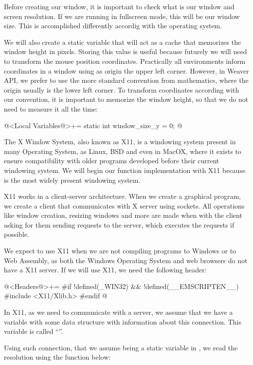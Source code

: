 Before creating our window, it is important to check what is our
window and screen resolution. If we are running in fullscreen mode,
this will be our window size. This is accomplished differently
accordig with the operating system.

We will also create a static variable that will act as a cache that
memorizes the window height in pixels. Storing this value is useful
because futurely we will need to transform the mouse position
coordinates. Practically all environments inform coordinates in a
window using as origin the upper left corner. However, in Weaver API,
we prefer to use the more standard convention from mathematics, where
the origin usually is the lower left corner. To transform coordinates
according with our convention, it is important to memorize the window
height, so that we do not need to measure it all the time:

\iniciocodigo
@<Local Variables@>+=
static int window_size_y = 0;
@
\fimcodigo


The X Window System, also known as X11, is a windowing system present
in many Operating System, as Linux, BSD and even in MacOX, where it
exists to ensure compatibility with older programs developed before
their current windowing system. We will begin our function
implementation with X11 because is the most widely present windowing
system.

X11 works in a client-server architecture. When we create a graphical
program, we create a client that communicates with X server using
sockets. All operations like window creation, resizing windows and
more are made when with the client asking for them sending requests to
the server, which executes the requests if possible.

We expect to use X11 when we are not compiling programs to Windows or
to Web Assembly, as both the Windows Operating System and web browsers
do not have a X11 server. If we will use X11, we need the following
header:

\iniciocodigo
@<Headers@>+=
#if !defined(_WIN32) && !defined(__EMSCRIPTEN__)
#include <X11/Xlib.h>
#endif
@
\fimcodigo

In X11, as we need to communicate with a server, we assume that we
have a variable with some data structure with information about this
connection. This variable is called ``''.

Using such connection, that we assume being a static variable
in , we read the resolution using the function
below:

